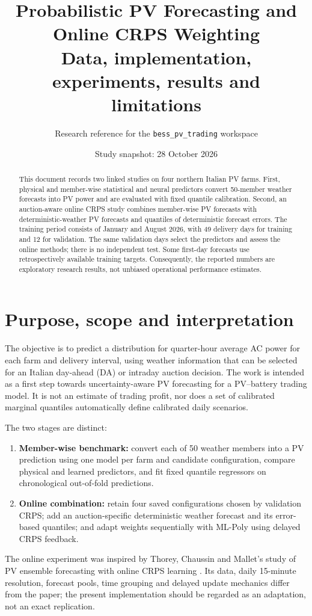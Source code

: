 \documentclass[11pt,a4paper]{article}
\title{Probabilistic PV Forecasting and Online CRPS Weighting\\\large Data, implementation, experiments, results and limitations}
\author{Research reference for the \texttt{bess\_pv\_trading} workspace}
\date{Study snapshot: 28 October 2026}
\begin{document}
\maketitle
\begin{abstract}
This document records two linked studies on four northern Italian PV farms. First, physical and member-wise statistical and neural predictors convert 50-member weather forecasts into PV power and are evaluated with fixed quantile calibration. Second, an auction-aware online CRPS study combines member-wise PV forecasts with deterministic-weather PV forecasts and quantiles of deterministic forecast errors. The training period consists of January and August 2026, with 49 delivery days for training and 12 for validation. The same validation days select the predictors and assess the online methods; there is no independent test. Some first-day forecasts use retrospectively available training targets. Consequently, the reported numbers are exploratory research results, not unbiased operational performance estimates.
\end{abstract}
\tableofcontents
\newpage
\section{Purpose, scope and interpretation}
The objective is to predict a distribution for quarter-hour average AC power for each farm and delivery interval, using weather information that can be selected for an Italian day-ahead (DA) or intraday auction decision. The work is intended as a first step towards uncertainty-aware PV forecasting for a PV--battery trading model. It is not an estimate of trading profit, nor does a set of calibrated marginal quantiles automatically define calibrated daily scenarios.

The two stages are distinct:
\begin{enumerate}
\item \textbf{Member-wise benchmark:} convert each of 50 weather members into a PV prediction using one model per farm and candidate configuration, compare physical and learned predictors, and fit fixed quantile regressors on chronological out-of-fold predictions.
\item \textbf{Online combination:} retain four saved configurations chosen by validation CRPS; add an auction-specific deterministic weather forecast and its error-based quantiles; and adapt weights sequentially with ML-Poly using delayed CRPS feedback.
\end{enumerate}
The online experiment was inspired by Thorey, Chaussin and Mallet's study of PV ensemble forecasting with online CRPS learning \cite{thorey2018}. Its data, daily 15-minute resolution, forecast pools, time grouping and delayed update mechanics differ from the paper; the present implementation should be regarded as an adaptation, not an exact replication.
\end{document}
